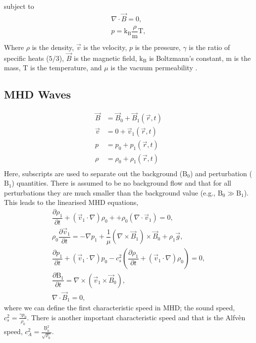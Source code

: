 subject to
\begin{align}
    \nabla \cdot \vec{B} = 0,
    \tag{Solenoid Equation}\\
    p = \mathrm{k_B} \dfrac{\rho}{\mathrm{m}} \mathrm{T},
    \tag{Ideal Gas Law}\\                        
\end{align}
Where $\rho$ is the density, $\vec{v}$ is the velocity, $p$ is the pressure, $\gamma$ is the ratio of specific heats ($5/3$), $\vec{B}$ is the magnetic field, $\mathrm{k_B}$ is Boltzmann's constant, $\mathrm{m}$ is the mass, $\mathrm{T}$ is the temperature, and $\mu$ is the vacuum permeability \citep{goedbloed2004}.


\subsection{MHD Waves}\label{sec:MHDwaves}


\begin{align*}                                                         
    \vec{B} &= \vec{B}_0 + \vec{B}_1(\vec{r},t)\\               
    \vec{v} &= 0 + \vec{v}_1(\vec{r},t)\\               
    p &= p_0 + {p_1}(\vec{r},t)\\               
    \rho &= \rho_0 + {\rho_1}(\vec{r},t)\\              
\end{align*}
Here, subscripts are used to separate out the background ($\mathrm{B}_0$) and perturbation ($\mathrm{B}_1$) quantities.
There is assumed to be no background flow and that for all perturbations they are much smaller than the background value (e.g., $\mathrm{B}_0 \gg \mathrm{B}_1$).      
This leads to the linearised MHD equations,
\begin{align}                                                         
    \dfrac{\partial \rho_1 }{\partial t} + (\vec{v}_1 \cdot \nabla)\rho_0 + + \rho_0 (\nabla \cdot \vec{v}_1) =       
    0,
    \tag{Mass Conservation}\\
    \rho_0 \dfrac{\partial \vec{v}_1}{\partial t} =
    -\nabla p_1 + \dfrac{1}{\mu}(\nabla \times \vec{B}_1) \times \vec{B}_0 + \rho_1 \vec{g},
    \tag{Equation of Motion}\\
    \dfrac{\partial p_1}{\partial t} + (\vec{v}_1 \cdot \nabla)p_0 - c_s^2 \left( \dfrac{\partial \rho_1}{\partial t} + (\vec{v}_1 \cdot \nabla)\rho_0 \right) = 0,
    \tag{Energy Equation}\\
    \dfrac{\partial \mathrm{B}_1}{\partial t} = \nabla \times (\vec{v}_1 \times \vec{B}_0),
    \tag{Induction Equation}\\
    \nabla \cdot \vec{B}_1 = 0,
    \tag{Solenoid Equation}               
\end{align}
where we can define the first characteristic speed in MHD; the sound speed, $c_s^2 = \frac{\gamma p_0}{\rho_0}$.
There is another important characteristic speed and that is the Alfv\`{e}n speed, $c_A^2 = \frac{\mathrm{\underline{B}}_0^2}{\sqrt{\rho_0}}$.

